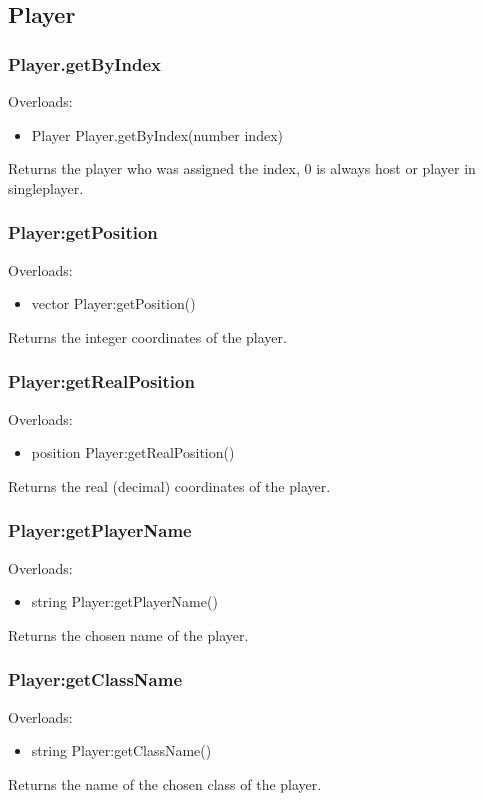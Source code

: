 \documentclass{book}
\newenvironment{ulist}
	{\begin{itemize}
			\itemsep0em}
	{\end{itemize}}
\begin{document}
\subsection{Player}
\subsubsection{Player.getByIndex}
Overloads:
\begin{ulist}
	\item Player Player.getByIndex(number index)
\end{ulist}
Returns the player who was assigned the index, 0 is always host or player in singleplayer.

\subsubsection{Player:getPosition}
Overloads:
\begin{ulist}
	\item vector Player:getPosition()
\end{ulist}
Returns the integer coordinates of the player.

\subsubsection{Player:getRealPosition}
Overloads:
\begin{ulist}
	\item position Player:getRealPosition()
\end{ulist}
Returns the real (decimal) coordinates of the player.

\subsubsection{Player:getPlayerName}
Overloads:
\begin{ulist}
	\item string Player:getPlayerName()
\end{ulist}
Returns the chosen name of the player.

\subsubsection{Player:getClassName}
Overloads:
\begin{ulist}
	\item string Player:getClassName()
\end{ulist}
Returns the name of the chosen class of the player.
\end{document}
